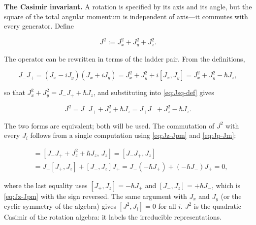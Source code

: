 \medskip\noindent\textbf{The Casimir invariant.} A rotation is specified by its axis and its angle, but the square of the total angular momentum is independent of axis---it commutes with every generator. Define
\begin{linenomath}
    \begin{equation}
        J^2 := J_x^2 + J_y^2 + J_z^2.
        \label{eq:Jsq-def}
    \end{equation}
\end{linenomath}
The operator can be rewritten in terms of the ladder pair. From the definitions,
\begin{linenomath}
    \begin{equation*}
        J_-J_+ = (J_x-iJ_y)(J_x+iJ_y) = J_x^2 + J_y^2 + i[J_x,J_y] = J_x^2 + J_y^2 - \hbar J_z,
    \end{equation*}
\end{linenomath}
so that $J_x^2+J_y^2 = J_-J_+ + \hbar J_z$, and substituting into \eqref{eq:Jsq-def} gives
\begin{linenomath}
    \begin{equation}
        J^2 = J_-J_+ + J_z^2 + \hbar J_z
        = J_+J_- + J_z^2 - \hbar J_z.
    \end{equation}
\end{linenomath}
The two forms are equivalent; both will be used. The commutation of $J^2$ with every $J_i$ follows from a single computation using \eqref{eq:Jz-Jpm} and \eqref{eq:Jp-Jm}:
\begin{linenomath}
    \begin{align*}
        [J^2,J_z] &= [J_-J_+ + J_z^2 + \hbar J_z,\,J_z]
        = [J_-J_+,J_z] \\
        &= J_-[J_+,J_z] + [J_-,J_z]J_+
        = J_-(-\hbar J_+) + (-\hbar J_-)J_+ = 0,
    \end{align*}
\end{linenomath}
where the last equality uses $[J_+,J_z] = -\hbar J_+$ and $[J_-,J_z] = +\hbar J_-$, which is \eqref{eq:Jz-Jpm} with the sign reversed. The same argument with $J_x$ and $J_y$ (or the cyclic symmetry of the algebra) gives $[J^2,J_i]=0$ for all $i$. $J^2$ is the quadratic Casimir of the rotation algebra: it labels the irreducible representations.

